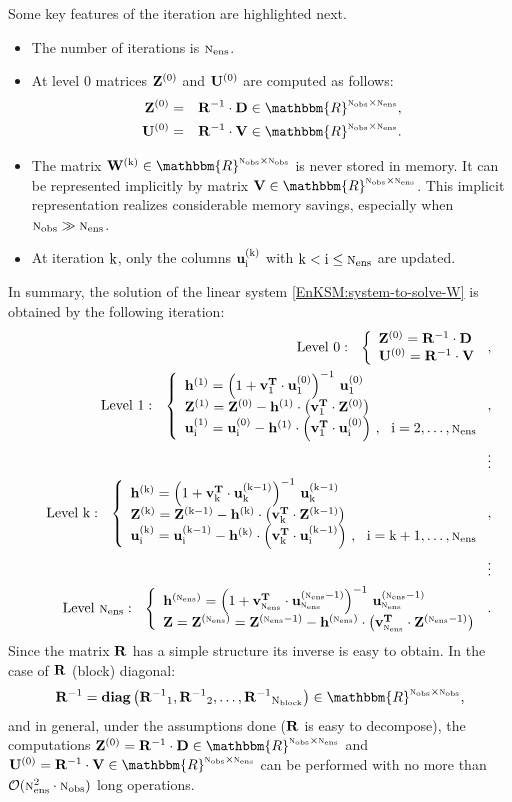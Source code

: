 \documentclass[12pt]{article}
\newcommand{\Nobs}{\textsc{n}_{{\rm obs}}}
\newcommand{\Nens}{\textsc{n}_{{\rm ens}}}
\newcommand{\BO}{{\mathcal O}}
\newcommand{\R}{{\bf R}}
\newcommand{\Z}{{\bf Z}}
\newcommand{\sZ}[1]{{\bf Z}^{\left(\rm #1 \right)}}
\newcommand{\h}[1]{{\bf h}^{\left( \rm #1\right)}}
\newcommand{\U}[1]{{\bf U}^{\left ( \rm #1 \right)}}
\renewcommand{\u}[2]{{\bf u}_{\rm #1}^{(\rm #2)}}
\newcommand{\D}{{\bf D}}
\newcommand{\W}[1]{{{\bf W}^{\left ( {\rm #1} \right )}}}
\newcommand{\V}{{\bf V}}
\renewcommand{\v}[1]{{\bf v}_{{\rm #1}}}
\renewcommand{\Re}{\mathbbm{R}}
\newcommand{\invS}[1]{ {#1^{-1}}}
\renewcommand{\k}{{\rm k}}
\newcommand{\level}[3]{
\text{ Level #1}:~~ \left\{ 
\begin{array}{l}
\h{#1} = \left( 1+\v{#1}^{ \bf T } \cdot \u{#1}{#2}\right)^{-1}\, \u{#1}{#2} \\
\sZ{#1} = \sZ{#2}-\h{#1} \cdot \left ( \v{#1}^{\bf T} \cdot \sZ{#2} \right ) \\
\u{i}{#1} = \u{i}{#2}-\h{#1} \cdot \left ( \v{#1}^{\bf T} \cdot \u{i}{#2} \right )\,, ~~ {\rm i}={\rm #3},\dots, \Nens \\
\end{array}
\right.
}
\newcommand{\diag}[2]{{\bf diag} \left ( #1_{1}, #1_{2}, \ldots ,  #1_{#2}\right )}
\begin{document}
Some key features of the iteration are highlighted next.
\begin{itemize}
\item The number of iterations is $\Nens$.
\item At level 0 matrices $\sZ{0}$ and $\U{0}$ are computed as follows:
\begin{eqnarray*} \nonumber
\displaystyle \sZ{0} &=& \invS{\R} \cdot \D \in \Re^{\Nobs \times \Nens}, \\ \nonumber
\U{0} &=& \invS{\R} \cdot \V \in \Re^{\Nobs \times \Nens}.
\end{eqnarray*}
\item The matrix $\W{k} \in \Re^{\Nobs \times \Nobs}$ is never stored in memory. It can be represented implicitly by matrix $\V \in \Re^{\Nobs \times \Nens}$. 
This implicit representation realizes considerable memory savings, especially when  $\Nobs \gg \Nens$.
\item At iteration $\k$, only the columns $\u{i}{k}$ with $\k<{\rm i} \le \Nens$ are updated.
\end{itemize}

In summary, the solution of the linear system \eqref{EnKSM:system-to-solve-W} is obtained by the following iteration:
\begin{eqnarray}
\label{EnKSM:iterative-sherman-derivation} \nonumber
\displaystyle 
&& \text{ Level 0}: ~~ \left\{
\begin{array}{l}
\sZ{0} = \invS{\R} \cdot \D \\ \nonumber
\U{0} = \invS{\R} \cdot \V 
\end{array}
\right.\,, \\ \nonumber
& & \level{1}{0}{2}, \\ \nonumber
& & \quad \vdots \\ \nonumber
& & \level{k}{k-1}{k+1}, \\ \nonumber
& & \quad \vdots \\ \nonumber
& & \text{ Level $\Nens$}:~~\left\{ 
\begin{array}{l}
\h{\Nens} = \left(1+\v{\Nens}^{ \bf T } \cdot \u{\Nens}{\Nens-1} \right)^{-1}\,\u{\Nens}{\Nens-1}  \\
\Z = \sZ{\Nens} = \sZ{\Nens-1}-\h{\Nens} \cdot \left ( \v{\Nens}^{\bf T} \cdot \sZ{\Nens-1} \right ) \\
\end{array}
\right. \, .
\end{eqnarray}
Since the matrix $\R$ has a simple structure its inverse is easy to obtain. In the case of $\R$ (block) diagonal:
\begin{eqnarray} \nonumber
\R^{-1} = \diag{\invS{\R}}{{\rm N_{block}}} \in \Re^{\Nobs \times \Nobs},
\end{eqnarray}
and in general, under the assumptions done ($\R$ is easy to decompose), the computations $\sZ{0} = \invS{\R} \cdot \D \in \Re^{\Nobs \times \Nens}$ and $\U{0} = \invS{\R} \cdot \V \in \Re^{\Nobs \times \Nens}$ can be performed with no more than $\BO(\Nens^2 \cdot \Nobs)$ long operations.
\end{document}
